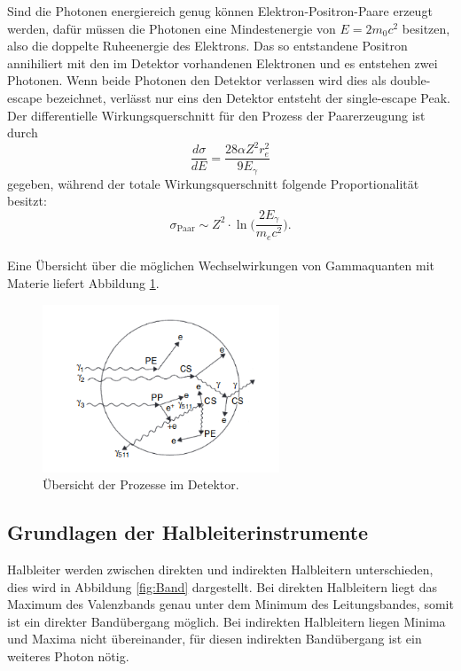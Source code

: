 Sind die Photonen energiereich genug können Elektron-Positron-Paare erzeugt werden, dafür müssen
die Photonen eine Mindestenergie von $E=2 m_0 c^2$ besitzen, also die doppelte
Ruheenergie des Elektrons.
Das so entstandene Positron annihiliert mit den im Detektor vorhandenen Elektronen und es
entstehen zwei Photonen. Wenn beide Photonen den Detektor verlassen wird dies als double-escape
bezeichnet, verlässt nur eins den Detektor entsteht der single-escape Peak.
Der differentielle Wirkungsquerschnitt für den Prozess der Paarerzeugung ist durch
\begin{equation}
  \frac{d\sigma}{dE}= \frac{28\alpha Z^2 r_{e}^2}{9E_{\gamma}}
  \label{eqn:diffPaar}
\end{equation}
gegeben, während der totale Wirkungsquerschnitt folgende Proportionalität besitzt:
\begin{equation}
  \sigma_{\text{Paar}}\sim Z^2\cdot\ln\Bigg(\frac{2E_{\gamma}}{m_e c^2}\Bigg).
  \label{eqn:WQPaar}
\end{equation}
\\

Eine Übersicht über die möglichen Wechselwirkungen von Gammaquanten mit Materie liefert
Abbildung \ref{fig:Effekt}.
\begin{figure}[H]
  \centering
  \includegraphics[height=5cm]{Effekte.png}
  \caption{Übersicht der Prozesse im Detektor. \cite{Gilmore2}}
  \label{fig:Effekt}
\end{figure}


\subsection{Grundlagen der Halbleiterinstrumente}
Halbleiter werden zwischen direkten und indirekten Halbleitern unterschieden, dies wird
in Abbildung \ref{fig:Band} dargestellt. Bei direkten Halbleitern
liegt das Maximum des Valenzbands genau unter dem Minimum des Leitungsbandes, somit ist ein direkter Bandübergang möglich.
Bei indirekten Halbleitern liegen Minima und Maxima nicht übereinander, für diesen indirekten Bandübergang ist
ein weiteres Photon nötig.\\


